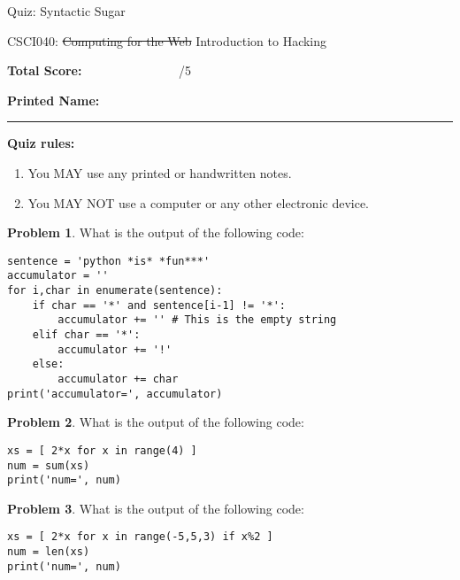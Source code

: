 \documentclass[10pt]{article}
\theoremstyle{definition}
\newtheorem{problem}{Problem}
\begin{document}
\begin{center}
    {
\Large
Quiz: Syntactic Sugar
}

    \vspace{0.1in}
    CSCI040: \sout{Computing for the Web} Introduction to Hacking

    \vspace{0.1in}
\end{center}

\vspace{0.15in}
\noindent
\textbf{Total Score:} ~~~~~~~~~~~~~~~/5

\vspace{0.5in}
\noindent
\textbf{Printed Name:}

\noindent
\rule{\textwidth}{0.1pt}
\vspace{0.25in}

\noindent
\textbf{Quiz rules:}
\begin{enumerate}
    \item You MAY use any printed or handwritten notes.
    \item You MAY NOT use a computer or any other electronic device.
\end{enumerate}

\noindent

\vspace{0.15in}


\begin{problem}
    What is the output of the following code:
\end{problem}
\begin{lstlisting}
sentence = 'python *is* *fun***'
accumulator = ''
for i,char in enumerate(sentence):
    if char == '*' and sentence[i-1] != '*':
        accumulator += '' # This is the empty string
    elif char == '*':
        accumulator += '!'
    else:
        accumulator += char
print('accumulator=', accumulator)
\end{lstlisting}
\vspace{1.05in}


\begin{problem}
    What is the output of the following code:
\end{problem}
\begin{lstlisting}
xs = [ 2*x for x in range(4) ]
num = sum(xs)
print('num=', num)
\end{lstlisting}
\vspace{1.5in}

\newpage
\begin{problem}
    What is the output of the following code:
\end{problem}
\begin{lstlisting}
xs = [ 2*x for x in range(-5,5,3) if x%2 ]
num = len(xs)
print('num=', num)
\end{lstlisting}
\vspace{3in}
\end{document}
